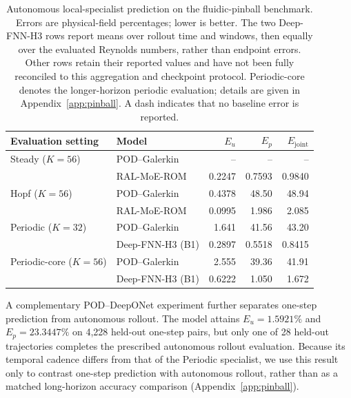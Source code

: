 \par
\begin{table}[H]
\centering
\caption{
Autonomous local-specialist prediction on the fluidic-pinball benchmark. Errors are physical-field percentages; lower is better. The two Deep-FNN-H3 rows report means over rollout time and windows, then equally over the evaluated Reynolds numbers, rather than endpoint errors. Other rows retain their reported values and have not been fully reconciled to this aggregation and checkpoint protocol. Periodic-core denotes the longer-horizon periodic evaluation; details are given in Appendix~\ref{app:pinball}. A dash indicates that no baseline error is reported.
}
\label{tab:pinball_autonomous}
\small
\setlength{\tabcolsep}{5pt}
\begin{tabular}{@{}llrrr@{}}
\toprule
Evaluation setting & Model & $E_u$ & $E_p$ & $E_{\mathrm{joint}}$ \\
\midrule
Steady ($K=56$)
& POD--Galerkin
& -- & -- & -- \\
& RAL-MoE-ROM
& 0.2247 & 0.7593 & 0.9840 \\
\addlinespace

Hopf ($K=56$)
& POD--Galerkin
& 0.4378 & 48.50 & 48.94 \\
& RAL-MoE-ROM
& 0.0995 & 1.986 & 2.085 \\
\addlinespace

Periodic ($K=32$)
& POD--Galerkin
& 1.641 & 41.56 & 43.20 \\
& Deep-FNN-H3 (B1)
& 0.2897 & 0.5518 & 0.8415 \\
\addlinespace

Periodic-core ($K=56$)
& POD--Galerkin
& 2.555 & 39.36 & 41.91 \\
& Deep-FNN-H3 (B1)
& 0.6222 & 1.050 & 1.672 \\
\bottomrule
\end{tabular}
\end{table}
\par

A complementary POD--DeepONet experiment further separates one-step prediction from autonomous rollout.
The model attains $E_u=1.5921\%$ and $E_p=23.3447\%$ on 4,228 held-out one-step pairs, but only one of 28 held-out trajectories completes the prescribed autonomous rollout evaluation. Because its temporal cadence differs from that of the Periodic specialist, we use this result only to contrast one-step prediction with autonomous rollout, rather than as a matched long-horizon accuracy comparison (Appendix~\ref{app:pinball}).






